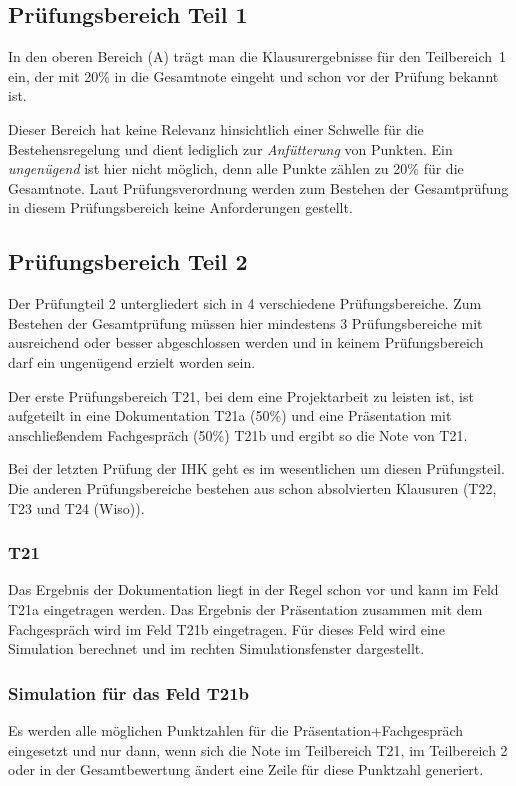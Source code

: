 \documentclass[a4paper,notitlepage,parskip=half]{scrartcl}
\begin{document}
\subsection{Prüfungsbereich Teil 1}
In den oberen Bereich (A) trägt man die Klausurergebnisse für den Teilbereich~1 ein, der mit 20\% in die Gesamtnote eingeht und schon vor der Prüfung bekannt ist.

Dieser Bereich hat keine Relevanz hinsichtlich einer Schwelle für die Bestehensregelung und dient lediglich zur \emph{Anfütterung} von Punkten. Ein \emph{ungenügend} ist hier nicht möglich, denn alle Punkte zählen zu 20\% für die Gesamtnote. Laut Prüfungsverordnung werden zum Bestehen der Gesamtprüfung in diesem Prüfungsbereich keine Anforderungen gestellt.

\subsection{Prüfungsbereich Teil 2}
Der Prüfungteil 2 untergliedert sich in 4 verschiedene Prüfungsbereiche. Zum Bestehen der Gesamtprüfung müssen hier mindestens 3 Prüfungsbereiche mit ausreichend oder besser abgeschlossen werden und in keinem Prüfungsbereich darf ein ungenügend erzielt worden sein.

Der erste Prüfungsbereich T21, bei dem eine Projektarbeit zu leisten ist, ist aufgeteilt in eine Dokumentation T21a (50\%) und eine Präsentation mit anschließendem Fachgespräch (50\%) T21b und ergibt so die Note von T21.

Bei der letzten Prüfung der IHK geht es im wesentlichen um diesen Prüfungsteil. Die anderen Prüfungsbereiche bestehen aus schon absolvierten Klausuren (T22, T23 und T24 (Wiso)). 
\subsubsection*{T21}
Das Ergebnis der Dokumentation liegt in der Regel schon vor und kann im Feld T21a eingetragen werden.
Das Ergebnis der Präsentation zusammen mit dem Fachgespräch wird im Feld T21b eingetragen.
Für dieses Feld wird eine Simulation berechnet und im rechten Simulationsfenster dargestellt.

\subsubsection*{Simulation für das Feld T21b}
Es werden alle möglichen Punktzahlen für die Präsentation+Fachgespräch eingesetzt und nur dann, wenn sich die Note im Teilbereich T21, im Teilbereich 2 oder in der Gesamtbewertung ändert eine Zeile für diese Punktzahl generiert. 
\end{document}
